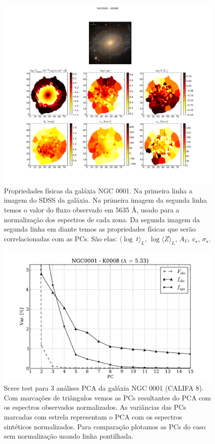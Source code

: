 \begin{figure}
    \includegraphics[width=1.\textwidth]{figuras/K0008-apresent.pdf}
    \caption[Propriedades f\'isicas da gal\'axia NGC 0001.]
    {Propriedades físicas da galáxia NGC 0001. Na primeira linha a imagem do SDSS da galáxia. Na primeira imagem da
    segunda linha temos o valor do fluxo observado em 5635 \AA, usado para a normalização dos espectros de cada zona. Da
    segunda imagem da segunda linha em diante temos as propriedades físicas que serão correlacionadas com as PCs. São
    elas: $\langle \log\ t\rangle_L$, $\log \langle Z \rangle_L$, $A_V$, $v_{\star}$, $\sigma_{\star}$.}
    \label{fig:K0008apresent}
\end{figure}

\begin{figure}
    \includegraphics[height=0.33\textheight]{figuras/K0008-screetest.pdf}
    \caption[Scree test comparativo entre 3 PCAs - NGC 0001.]
    {Scree test para 3 análises PCA da galáxia NGC 0001 (CALIFA 8). Com marcações de triângulos vemos as PCs
    resultantes do PCA com os espectros observados normalizados. As variâncias das PCs marcadas com estrela representam
    o PCA com os espectros sintéticos normalizados. Para comparação plotamos as PCs do caso sem normalização usando
    linha pontilhada.}
    \label{fig:K0008scree}
\end{figure}

